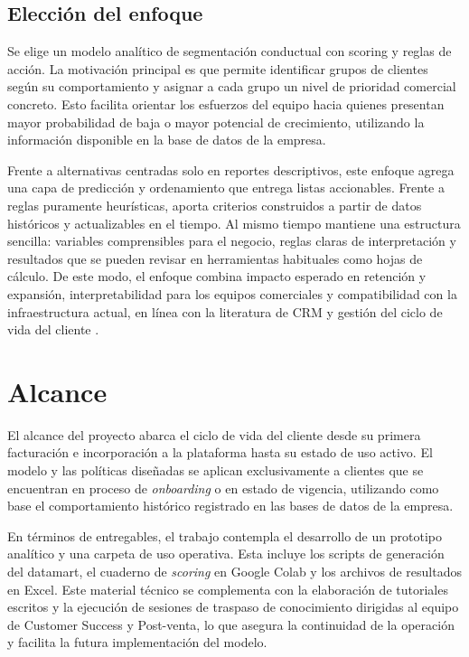 \subsection{Elección del enfoque}

Se elige un modelo analítico de segmentación conductual con scoring y reglas de acción. La motivación principal es que permite identificar grupos de clientes según su comportamiento y asignar a cada grupo un nivel de prioridad comercial concreto. Esto facilita orientar los esfuerzos del equipo hacia quienes presentan mayor probabilidad de baja o mayor potencial de crecimiento, utilizando la información disponible en la base de datos de la empresa.

Frente a alternativas centradas solo en reportes descriptivos, este enfoque agrega una capa de predicción y ordenamiento que entrega listas accionables. Frente a reglas puramente heurísticas, aporta criterios construidos a partir de datos históricos y actualizables en el tiempo. Al mismo tiempo mantiene una estructura sencilla: variables comprensibles para el negocio, reglas claras de interpretación y resultados que se pueden revisar en herramientas habituales como hojas de cálculo. De este modo, el enfoque combina impacto esperado en retención y expansión, interpretabilidad para los equipos comerciales y compatibilidad con la infraestructura actual, en línea con la literatura de CRM y gestión del ciclo de vida del cliente \citep{Kumar2010}.

\section{Alcance}

El alcance del proyecto abarca el ciclo de vida del cliente desde su primera facturación e incorporación a la plataforma hasta su estado de uso activo. El modelo y las políticas diseñadas se aplican exclusivamente a clientes que se encuentran en proceso de \textit{onboarding} o en estado de vigencia, utilizando como base el comportamiento histórico registrado en las bases de datos de la empresa.

En términos de entregables, el trabajo contempla el desarrollo de un prototipo analítico y una carpeta de uso operativa. Esta incluye los scripts de generación del datamart, el cuaderno de \textit{scoring} en Google Colab y los archivos de resultados en Excel. Este material técnico se complementa con la elaboración de tutoriales escritos y la ejecución de sesiones de traspaso de conocimiento dirigidas al equipo de Customer Success y Post-venta, lo que asegura la continuidad de la operación y facilita la futura implementación del modelo.

